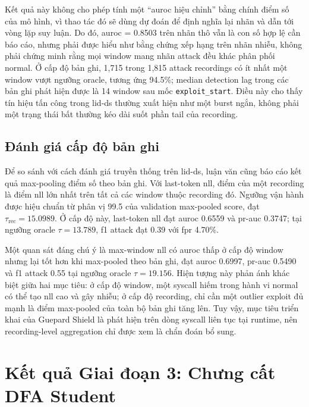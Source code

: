 \documentclass[../main.tex]{subfiles}
\begin{document}
Kết quả này không cho phép tính một ``\gls{auroc} hiệu chỉnh'' bằng chính
điểm số của mô hình,
vì thao tác đó sẽ dùng dự đoán để định nghĩa lại nhãn và dẫn tới vòng
lặp suy luận. Do
đó, \gls{auroc} = 0.8503 trên nhãn thô vẫn là con số hợp lệ cần báo cáo,
nhưng phải được hiểu
như bằng chứng xếp hạng trên nhãn nhiễu, không phải chứng minh rằng
mọi window mang nhãn
attack đều khác phân phối normal. Ở cấp độ bản ghi, 1,715 trong 1,815
attack recordings
có ít nhất một window vượt ngưỡng oracle, tương ứng 94.5\%; median
detection lag trong
các bản ghi phát hiện được là 14 window sau mốc
\texttt{exploit\_start}. Điều này cho
thấy tín hiệu tấn công trong \gls{lid-ds} thường xuất hiện như một burst
ngắn, không phải một
trạng thái bất thường kéo dài suốt phần tail của recording.

\subsection{Đánh giá cấp độ bản ghi}
\label{subsec:p2_recording_eval}

Để so sánh với cách đánh giá truyền thống trên \gls{lid-ds}, luận văn cũng
báo cáo kết quả
max-pooling điểm số theo bản ghi. Với last-token \gls{nll}, điểm của một
recording là điểm
\gls{nll} lớn nhất trên tất cả các window thuộc recording đó. Ngưỡng vận
hành được hiệu chuẩn
từ phân vị 99.5 của validation max-pooled score, đạt
$\tau_{\text{rec}} = 15.0989$.
Ở cấp độ này, last-token \gls{nll} đạt \gls{auroc} 0.6559 và \gls{pr-auc} 0.3747; tại
ngưỡng oracle
$\tau = 13.789$, \gls{f1} attack đạt 0.39 với \gls{fpr} 4.70\%.

Một quan sát đáng chú ý là max-window \gls{nll} có \gls{auroc} thấp ở cấp độ
window nhưng lại tốt
hơn khi max-pooled theo bản ghi, đạt \gls{auroc} 0.6997, \gls{pr-auc} 0.5490 và
\gls{f1} attack 0.55 tại
ngưỡng oracle $\tau = 19.156$. Hiện tượng này phản ánh khác biệt giữa
hai mục tiêu:
ở cấp độ window, một \gls{syscall} hiếm trong hành vi normal có thể tạo \gls{nll}
cao và gây nhiễu;
ở cấp độ recording, chỉ cần một outlier exploit đủ mạnh là điểm
max-pooled của toàn bộ
bản ghi tăng lên. Tuy vậy, mục tiêu triển khai của Guepard Shield là
phát hiện trên
dòng \gls{syscall} liên tục tại runtime, nên recording-level aggregation
chỉ được xem là
chẩn đoán bổ sung.

\section{Kết quả Giai đoạn 3: Chưng cất DFA Student}
\label{sec:p3_results}
\end{document}

